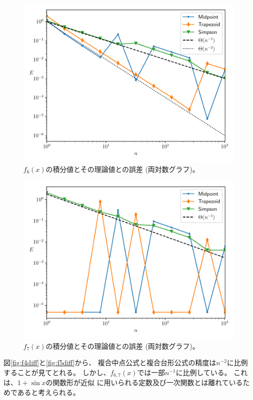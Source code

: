 \documentclass[a4j, titlepage]{jsarticle}
\numberwithin{equation}{section}
\begin{document}
                \begin{figure}[h]
                    \centering
                    \includegraphics[width=0.8\hsize]{kadai2/3/f6.pdf}
                    \caption{
                        $f_6(x)$の積分値とその理論値との誤差 (両対数グラフ)。
                    }
                    \label{fig:f6diff}
                \end{figure}
                \begin{figure}[h]
                    \centering
                    \includegraphics[width=0.8\hsize]{kadai2/3/f7.pdf}
                    \caption{
                        $f_7(x)$の積分値とその理論値との誤差 (両対数グラフ)。
                    }
                    \label{fig:f7diff}
                \end{figure}

                図\ref{fig:f4diff}と\ref{fig:f5diff}から、
                複合中点公式と複合台形公式の精度は$n^{-2}$に比例することが見てとれる。
                しかし、$f_{6,7}(x)$では一部$n^{-1}$に比例している。
                これは、$1+\sin x$の関数形が近似
                に用いられる定数及び一次関数とは離れているためであると考えられる。
                
\end{document}
